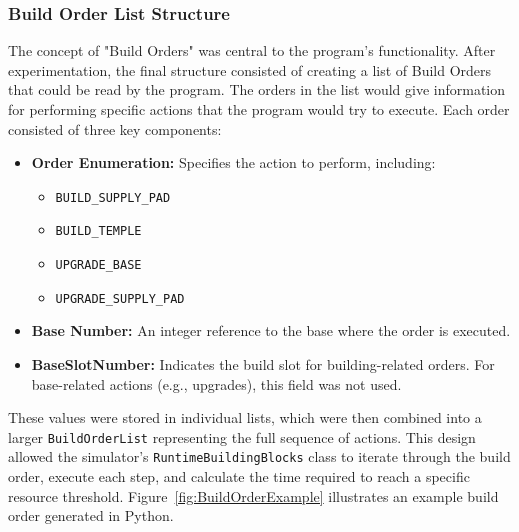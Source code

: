 \documentclass[a4paper, 12pt, english]{article}
\begin{document}
\subsubsection{Build Order List Structure}
The concept of "Build Orders" was central to the program's functionality. After experimentation, the final structure consisted of creating a list of Build Orders that could be read by the program. The orders in the list would give information for performing specific actions that the program would try to execute. Each order consisted of three key components:
\newpage
\begin{itemize}
    \item \textbf{Order Enumeration:} Specifies the action to perform, including:
        \begin{itemize}
            \item \texttt{BUILD\_SUPPLY\_PAD}
            \item \texttt{BUILD\_TEMPLE}
            \item \texttt{UPGRADE\_BASE}
            \item \texttt{UPGRADE\_SUPPLY\_PAD}
        \end{itemize}
    \item \textbf{Base Number:} An integer reference to the base where the order is executed.
    \item \textbf{BaseSlotNumber:} Indicates the build slot for building-related orders. For base-related actions (e.g., upgrades), this field was not used.
\end{itemize}

These values were stored in individual lists, which were then combined into a larger \texttt{BuildOrderList} representing the full sequence of actions. This design allowed the simulator’s \texttt{RuntimeBuildingBlocks} class to iterate through the build order, execute each step, and calculate the time required to reach a specific resource threshold. Figure~\ref{fig:BuildOrderExample} illustrates an example build order generated in Python.
\end{document}
